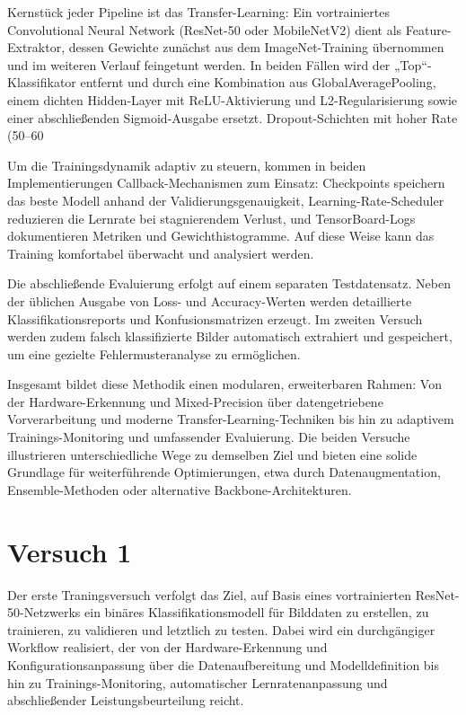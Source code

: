 Kernstück jeder Pipeline ist das Transfer-Learning: Ein vortrainiertes Convolutional Neural Network (ResNet-50 oder MobileNetV2) dient als Feature-Extraktor, dessen Gewichte zunächst aus dem ImageNet-Training übernommen und im weiteren Verlauf feingetunt werden. In beiden Fällen wird der „Top“-Klassifikator entfernt und durch eine Kombination aus GlobalAveragePooling, einem dichten Hidden-Layer mit ReLU-Aktivierung und L2-Regularisierung sowie einer abschließenden Sigmoid-Ausgabe ersetzt. Dropout-Schichten mit hoher Rate (50–60 %

Um die Trainingsdynamik adaptiv zu steuern, kommen in beiden Implementierungen Callback-Mechanismen zum Einsatz: Checkpoints speichern das beste Modell anhand der Validierungsgenauigkeit, Learning-Rate-Scheduler reduzieren die Lernrate bei stagnierendem Verlust, und TensorBoard-Logs dokumentieren Metriken und Gewichthistogramme. Auf diese Weise kann das Training komfortabel überwacht und analysiert werden.

Die abschließende Evaluierung erfolgt auf einem separaten Testdatensatz. Neben der üblichen Ausgabe von Loss- und Accuracy-Werten werden detaillierte Klassifikationsreports und Konfusionsmatrizen erzeugt. Im zweiten Versuch werden zudem falsch klassifizierte Bilder automatisch extrahiert und gespeichert, um eine gezielte Fehlermusteranalyse zu ermöglichen.

Insgesamt bildet diese Methodik einen modularen, erweiterbaren Rahmen: Von der Hardware-Erkennung und Mixed-Precision über datengetriebene Vorverarbeitung und moderne Transfer-Learning-Techniken bis hin zu adaptivem Trainings-Monitoring und umfassender Evaluierung. Die beiden Versuche illustrieren unterschiedliche Wege zu demselben Ziel und bieten eine solide Grundlage für weiterführende Optimierungen, etwa durch Datenaugmentation, Ensemble-Methoden oder alternative Backbone-Architekturen.

\section{Versuch 1}

Der erste Traningsversuch verfolgt das Ziel, auf Basis eines vortrainierten ResNet-50-Netzwerks ein binäres Klassifikationsmodell für Bilddaten zu erstellen, zu trainieren, zu validieren und letztlich zu testen. Dabei wird ein durchgängiger Workflow realisiert, der von der Hardware-Erkennung und Konfigurationsanpassung über die Datenaufbereitung und Modelldefinition bis hin zu Trainings-Monitoring, automatischer Lernratenanpassung und abschließender Leistungsbeurteilung reicht.


